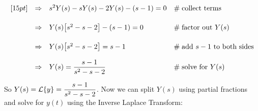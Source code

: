 \documentclass{article}
\theoremstyle{definition}
\begin{document}
\begin{equation*}
\begin{array}{lllll}
[15pt]          
&\Rightarrow&  s^2 Y(s) - s Y(s) - 2 Y(s) - (s - 1)                                                                                   = 0             &\mathrel{\#} \text{collect terms}                                                                                            \\
[15pt]
&\Rightarrow&  Y(s) \big [s^2- s - 2 \big] - (s - 1)                                                                                   = 0             &\mathrel{\#} \text{factor out $Y(s)$}                                                                                      \\
[15pt]
&\Rightarrow&  Y(s) \big [s^2- s - 2 \big]                                                                                               = s - 1         &\mathrel{\#} \text{add $s - 1$ to both sides}                                                                         \\
[12pt]
&\Rightarrow&  Y(s) = \mathlarger{\frac{s - 1}{s^2 -s -2}}  &\mathrel{\#} \text{solve for $Y(s)$}
\end{array}
\end{equation*}

\bigskip
\noindent
So $Y(s) = \mathcal{L}\{y\} = \mathlarger{\frac{s - 1}{s^2 -s -2}}$. Now we can split $Y(s)$ using partial fractions and solve for $y(t)$ using the Inverse Laplace Transform:
\end{document}
